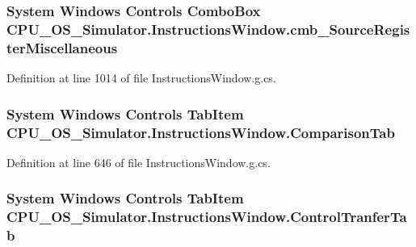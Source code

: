 \subsubsection[{cmb\+\_\+\+Source\+Register\+Miscellaneous}]{\setlength{\rightskip}{0pt plus 5cm}System Windows Controls Combo\+Box C\+P\+U\+\_\+\+O\+S\+\_\+\+Simulator.\+Instructions\+Window.\+cmb\+\_\+\+Source\+Register\+Miscellaneous\hspace{0.3cm}{\ttfamily [package]}}\label{class_c_p_u___o_s___simulator_1_1_instructions_window_a98245ef6ca4796b7f59fe4b9937a388e}


Definition at line 1014 of file Instructions\+Window.\+g.\+cs.

\hypertarget{class_c_p_u___o_s___simulator_1_1_instructions_window_ab807abcf9c3955ae2ff78e1d667820b2}{}
\subsubsection[{Comparison\+Tab}]{\setlength{\rightskip}{0pt plus 5cm}System Windows Controls Tab\+Item C\+P\+U\+\_\+\+O\+S\+\_\+\+Simulator.\+Instructions\+Window.\+Comparison\+Tab\hspace{0.3cm}{\ttfamily [package]}}\label{class_c_p_u___o_s___simulator_1_1_instructions_window_ab807abcf9c3955ae2ff78e1d667820b2}


Definition at line 646 of file Instructions\+Window.\+g.\+cs.

\hypertarget{class_c_p_u___o_s___simulator_1_1_instructions_window_a52cb165b57f01928c088b3052de70b5b}{}
\subsubsection[{Control\+Tranfer\+Tab}]{\setlength{\rightskip}{0pt plus 5cm}System Windows Controls Tab\+Item C\+P\+U\+\_\+\+O\+S\+\_\+\+Simulator.\+Instructions\+Window.\+Control\+Tranfer\+Tab\hspace{0.3cm}{\ttfamily [package]}}\label{class_c_p_u___o_s___simulator_1_1_instructions_window_a52cb165b57f01928c088b3052de70b5b}



